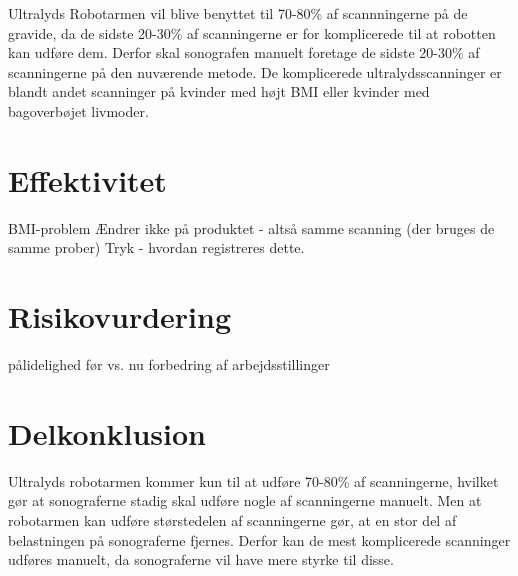 Ultralyds Robotarmen vil blive benyttet til 70-80\% af scannningerne på de gravide, da de sidste 20-30\% af scanningerne er for komplicerede til at robotten kan udføre dem. Derfor skal sonografen manuelt foretage de sidste 20-30\% af scanningerne på den nuværende metode. De komplicerede ultralydsscanninger er blandt andet scanninger på kvinder med højt BMI eller kvinder med bagoverbøjet livmoder. 
\section{Effektivitet}
BMI-problem
Ændrer ikke på produktet - altså samme scanning (der bruges de samme prober)
Tryk - hvordan registreres dette.
\section{Risikovurdering}
pålidelighed
før vs. nu
forbedring af arbejdsstillinger
\section{Delkonklusion}
Ultralyds robotarmen kommer kun til at udføre 70-80\% af scanningerne, hvilket gør at sonograferne stadig skal udføre nogle af scanningerne manuelt. Men at robotarmen kan udføre størstedelen af scanningerne gør, at en stor del af belastningen på sonograferne fjernes. Derfor kan de mest komplicerede scanninger udføres manuelt, da sonograferne vil have mere styrke til disse.

